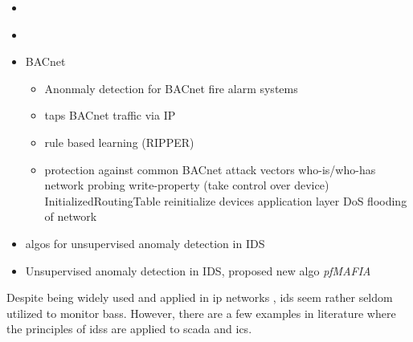 

\begin{itemize}
	\item \parencite{Yang2006}
	\item \parencite{Celeda2012}
	\item \textcite{Pan2014} BACnet
	\begin{itemize}
		\item Anonmaly detection for BACnet fire alarm systems
		\item taps BACnet traffic via IP
		\item rule based learning (RIPPER)
		\item protection against common BACnet attack vectors
		\subitem who-is/who-has network probing
		\subitem write-property (take control over device)
		\subitem InitializedRoutingTable
		\subitem reinitialize devices
		\subitem application layer DoS
		\subitem flooding of network
	\end{itemize}
	
	\item \textcite{Eskin2002} algos for unsupervised anomaly detection in IDS
	\item \textcite{Leung2005} Unsupervised anomaly detection in IDS, proposed new algo \emph{pfMAFIA}
\end{itemize}

Despite being widely used and applied in \gls{ip} networks \parencite[cf.][pp.~201~ff.]{Northcutt2005}, \gls{ids} seem rather seldom utilized to monitor \glspl{bas}.
However, there are a few examples in literature where the principles of \glspl{ids} are applied to \gls{scada} and \gls{ics}.

